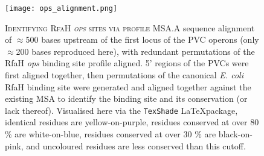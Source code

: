 \vspace{1cm}
\begin{figure}[h]
\texttt{[image: ops\_alignment.png]}
%
%
%
%
%
	\captionsetup{singlelinecheck=off, justification=justified, font=footnotesize, aboveskip=5pt}
	\caption[Multiple sequence alignment of redundant RfaH \emph{ops} sites]{\textsc{\normalsize Identifying RfaH \emph{ops} sites via profile MSA.}\vspace{0.1cm}\newline A sequence alignment of $\approx$500 bases upstream of the first locus of the PVC operons (only $\approx$200 bases reproduced here), with redundant permutations of the RfaH \emph{ops} binding site profile aligned. 5' regions of the PVCs were first aligned together, then permutations of the canonical \emph{E. coli} RfaH binding site were generated and aligned together against the existing MSA to identify the binding site and its conservation (or lack thereof). Visualised here via the \texttt{TexShade} \LaTeX package, identical residues are yellow-on-purple, residues conserved at over 80 \% are white-on-blue, residues conserved at over 30 \% are black-on-pink, and uncoloured residues are less conserved than this cutoff.}
	\label{rfahmsa}
\end{figure}
\clearpage

